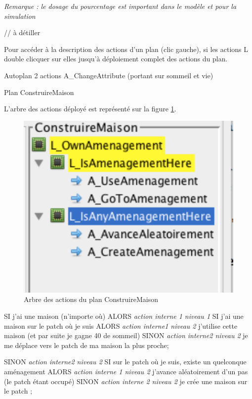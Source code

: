 \documentclass[a4paper,oneside,12 pt]{article}
\begin{document}
\textit{Remarque : le dosage du pourcentage est important dans le modèle et pour la simulation}

// à détiller

Pour accéder à la description des actions d'un plan (clic gauche), si les actions L double clicquer sur elles jusqu'à déploiement complet des actions du plan.


Autoplan
	2 actions A\_ChangeAttribute (portant sur sommeil et vie)
	
	
Plan ConstruireMaison

L'arbre des actions déployé est représenté sur la figure \ref{PL}.
\begin{figure}[!ht]
\begin{center}
\includegraphics[scale=0.5]{planex.pdf}
\caption[PL]{Arbre des actions du plan ConstruireMaison \\}
\label{PL}
\end{center}
\end{figure} 

SI j'ai une maison (n'importe où) ALORS
		\textit{action interne 1 niveau 1}
		SI j'ai une maison sur le patch où je suis ALORS
				\textit{action interne1 niveau 2 }
				j'utilise cette maison (et par suite je gagne 40 de sommeil)
		SINON
				\textit{action interne2 niveau 2 }
				je me déplace vers le patch de ma maison la plus proche;

SINON
		\textit{action interne2 niveau 2 }
		SI sur le patch où je suis, existe un quelconque aménagement ALORS
			\textit{ action interne 1 niveau 2} 
			 j'avance aléatoirement d'un pas (le patch étant occupé)
		SINON
			\textit{action interne 2 niveau 2 }
			je crée une maison sur le patch 
;
\end{document}
